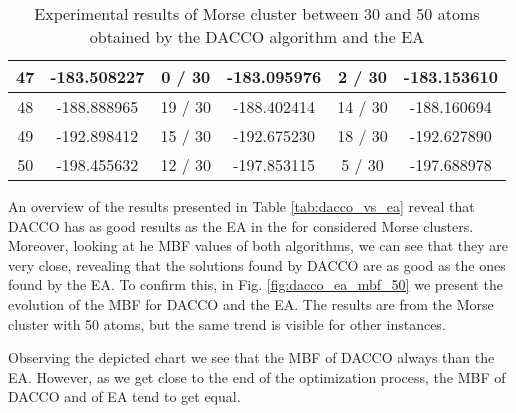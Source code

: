 \begin{table}[!htdp]
\begin{center}
\begin{tabular}{| c | c | c | c | c | c |}
						47 & -183.508227 & 0 / 30 & -183.095976 & 2 / 30 & -183.153610 \\ \hline
						48 & -188.888965 & 19 / 30 & -188.402414 & 14 / 30 & -188.160694 \\ \hline
						49 & -192.898412 & 15 / 30 & -192.675230 & 18 / 30 & -192.627890 \\ \hline
						50 & -198.455632 & 12 / 30 & -197.853115 & 5 / 30 & -197.688978 \\ \hline
					\end{tabular}
				\end{center}
				\caption{Experimental results of Morse cluster between 30 and 50 atoms obtained by the DACCO algorithm and the EA}
			\end{table}
			
			An overview of the results presented in Table \ref{tab:dacco_vs_ea} reveal that DACCO has as good results as the EA in the for considered Morse clusters. Moreover, looking at he MBF values of both algorithms, we can see that they are very close, revealing that the solutions found by DACCO are as good as the ones found by the EA. To confirm this, in Fig. \ref{fig:dacco_ea_mbf_50} we present the evolution of the MBF for DACCO and the EA. The results are from the Morse cluster with 50 atoms, but the same trend is visible for other instances. 
			
			Observing the depicted chart we see that the MBF of DACCO always than the EA. However, as we get close to the end of the optimization process, the MBF of DACCO and of EA tend to get equal.
			
